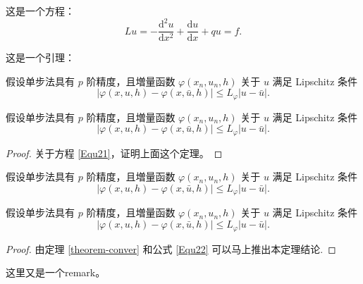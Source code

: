 \documentclass{shnuthesis}
\begin{document}
这是一个方程：
\begin{equation}\label{Equ21}
L u=-\frac{\mathrm{d}^{2} u}{\mathrm{d} x^{2}}+\frac{\mathrm{d} u}{\mathrm{d} x}+q u=f.
\end{equation}

这是一个引理：
\begin{lemma}\label{lemma-conver}
假设单步法具有 $p$ 阶精度，且増量函数 $\varphi(x_{n}, u_{n}, h)$ 关于 $u$ 满足 Lipschitz 条件
\begin{equation}\label{Equ22}
|\varphi(x, u, h)-\varphi(x, \bar{u}, h)| \leqslant L_{\varphi}|u-\bar{u}|.
\end{equation}
\end{lemma}

\begin{theorem}\label{theorem-conver}
假设单步法具有 $p$ 阶精度，且増量函数 $\varphi(x_{n}, u_{n}, h)$ 关于 $u$ 满足 Lipschitz 条件
\begin{equation}\label{Equ23}
|\varphi(x, u, h)-\varphi(x, \bar{u}, h)| \leqslant L_{\varphi}|u-\bar{u}|.
\end{equation}
\end{theorem}
\begin{proof}
关于方程 \eqref{Equ21}，证明上面这个定理。
\end{proof}


\begin{theorem}\label{theorem-conver2}
假设单步法具有 $p$ 阶精度，且増量函数 $\varphi(x_{n}, u_{n}, h)$ 关于 $u$ 满足 Lipschitz 条件
\begin{equation}\label{Equ24}
|\varphi(x, u, h)-\varphi(x, \bar{u}, h)| \leqslant L_{\varphi}|u-\bar{u}|.
\end{equation}
\end{theorem}

\begin{corollary}\label{col-conver}
假设单步法具有 $p$ 阶精度，且増量函数 $\varphi(x_{n}, u_{n}, h)$ 关于 $u$ 满足 Lipschitz 条件
\begin{equation}\label{Equ25}
|\varphi(x, u, h)-\varphi(x, \bar{u}, h)| \leqslant L_{\varphi}|u-\bar{u}|.
\end{equation}
\end{corollary}
\begin{proof}
 由定理 \ref{theorem-conver} 和公式 \ref{Equ22} 可以马上推出本定理结论.
\end{proof}

\begin{remark}\label{rem2}
这里又是一个remark。
\end{remark}
\end{document}
